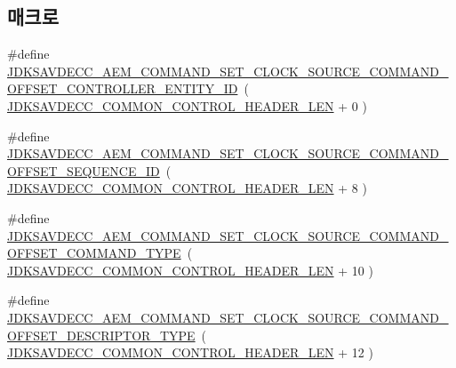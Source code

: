 \subsection*{매크로}
\begin{DoxyCompactItemize}
\item 
\#define \hyperlink{group__command__set__clock__source_ga6f6252d6d338605272ef77c8d533d675}{J\+D\+K\+S\+A\+V\+D\+E\+C\+C\+\_\+\+A\+E\+M\+\_\+\+C\+O\+M\+M\+A\+N\+D\+\_\+\+S\+E\+T\+\_\+\+C\+L\+O\+C\+K\+\_\+\+S\+O\+U\+R\+C\+E\+\_\+\+C\+O\+M\+M\+A\+N\+D\+\_\+\+O\+F\+F\+S\+E\+T\+\_\+\+C\+O\+N\+T\+R\+O\+L\+L\+E\+R\+\_\+\+E\+N\+T\+I\+T\+Y\+\_\+\+ID}~( \hyperlink{group__jdksavdecc__avtp__common__control__header_gaae84052886fb1bb42f3bc5f85b741dff}{J\+D\+K\+S\+A\+V\+D\+E\+C\+C\+\_\+\+C\+O\+M\+M\+O\+N\+\_\+\+C\+O\+N\+T\+R\+O\+L\+\_\+\+H\+E\+A\+D\+E\+R\+\_\+\+L\+EN} + 0 )
\item 
\#define \hyperlink{group__command__set__clock__source_ga46e76786ea8d5b798960b2ee8da50d46}{J\+D\+K\+S\+A\+V\+D\+E\+C\+C\+\_\+\+A\+E\+M\+\_\+\+C\+O\+M\+M\+A\+N\+D\+\_\+\+S\+E\+T\+\_\+\+C\+L\+O\+C\+K\+\_\+\+S\+O\+U\+R\+C\+E\+\_\+\+C\+O\+M\+M\+A\+N\+D\+\_\+\+O\+F\+F\+S\+E\+T\+\_\+\+S\+E\+Q\+U\+E\+N\+C\+E\+\_\+\+ID}~( \hyperlink{group__jdksavdecc__avtp__common__control__header_gaae84052886fb1bb42f3bc5f85b741dff}{J\+D\+K\+S\+A\+V\+D\+E\+C\+C\+\_\+\+C\+O\+M\+M\+O\+N\+\_\+\+C\+O\+N\+T\+R\+O\+L\+\_\+\+H\+E\+A\+D\+E\+R\+\_\+\+L\+EN} + 8 )
\item 
\#define \hyperlink{group__command__set__clock__source_gadc0f6eb9839d9c7a3eeca5687ea1862c}{J\+D\+K\+S\+A\+V\+D\+E\+C\+C\+\_\+\+A\+E\+M\+\_\+\+C\+O\+M\+M\+A\+N\+D\+\_\+\+S\+E\+T\+\_\+\+C\+L\+O\+C\+K\+\_\+\+S\+O\+U\+R\+C\+E\+\_\+\+C\+O\+M\+M\+A\+N\+D\+\_\+\+O\+F\+F\+S\+E\+T\+\_\+\+C\+O\+M\+M\+A\+N\+D\+\_\+\+T\+Y\+PE}~( \hyperlink{group__jdksavdecc__avtp__common__control__header_gaae84052886fb1bb42f3bc5f85b741dff}{J\+D\+K\+S\+A\+V\+D\+E\+C\+C\+\_\+\+C\+O\+M\+M\+O\+N\+\_\+\+C\+O\+N\+T\+R\+O\+L\+\_\+\+H\+E\+A\+D\+E\+R\+\_\+\+L\+EN} + 10 )
\item 
\#define \hyperlink{group__command__set__clock__source_ga3c06f98a46f6d736b6215fce4b980fd4}{J\+D\+K\+S\+A\+V\+D\+E\+C\+C\+\_\+\+A\+E\+M\+\_\+\+C\+O\+M\+M\+A\+N\+D\+\_\+\+S\+E\+T\+\_\+\+C\+L\+O\+C\+K\+\_\+\+S\+O\+U\+R\+C\+E\+\_\+\+C\+O\+M\+M\+A\+N\+D\+\_\+\+O\+F\+F\+S\+E\+T\+\_\+\+D\+E\+S\+C\+R\+I\+P\+T\+O\+R\+\_\+\+T\+Y\+PE}~( \hyperlink{group__jdksavdecc__avtp__common__control__header_gaae84052886fb1bb42f3bc5f85b741dff}{J\+D\+K\+S\+A\+V\+D\+E\+C\+C\+\_\+\+C\+O\+M\+M\+O\+N\+\_\+\+C\+O\+N\+T\+R\+O\+L\+\_\+\+H\+E\+A\+D\+E\+R\+\_\+\+L\+EN} + 12 )

\end{DoxyCompactItemize}
